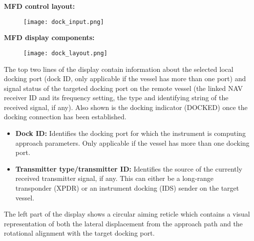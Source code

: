\documentclass[Orbiter User Manual.tex]{subfiles}
\begin{document}
\noindent
\textbf{MFD control layout:}

\begin{figure}[H]
  \centering
  \texttt{[image: dock\_input.png]}
\end{figure}

\noindent
\textbf{MFD display components:}

\begin{figure}[H]
  \centering
  \texttt{[image: dock\_layout.png]}
\end{figure}

\noindent
The top two lines of the display contain information about the selected local docking port (dock ID, only applicable if the vessel has more than one port) and signal status of the targeted docking port on the remote vessel (the linked NAV receiver ID and its frequency setting, the type and identifying string of the received signal, if any). Also shown is the docking indicator (DOCKED) once the docking connection has been established.


\begin{itemize}
\item \textbf{Dock ID:} Identifies the docking port for which the instrument is computing approach parameters. Only applicable if the vessel has more than one docking port.
\item \textbf{Transmitter type/transmitter ID:} Identifies the source of the currently received transmitter signal, if any. This can either be a long-range transponder (XPDR) or an instrument docking (IDS) sender on the target vessel.
\end{itemize}

\noindent
The left part of the display shows a circular aiming reticle which contains a visual representation of both the lateral displacement from the approach path and the rotational alignment with the target docking port.
\end{document}
